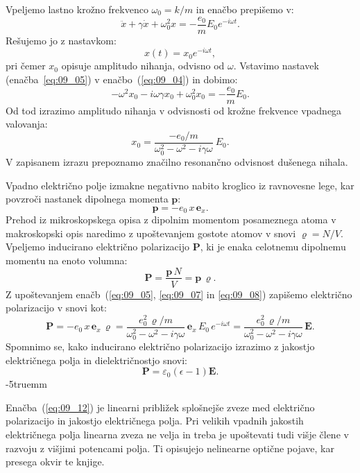 Vpeljemo lastno krožno frekvenco $\omega_0 = k/m$ in 
enačbo prepišemo v:
\begin{equation}
\ddot{x} + \gamma \dot{x} + \omega_0^2 x  = - \frac{e_0}{m} E_0 e^{-i \omega t}.
\label{eq:09_04}
\end{equation}
Rešujemo jo z nastavkom:
\begin{equation}
x(t) = x_0 e^{-i\omega t},
\label{eq:09_05}
\end{equation}
pri čemer $x_0$ opisuje amplitudo nihanja, odvisno od $\omega$. Vstavimo nastavek 
(enačba~\ref{eq:09_05}) v enačbo~(\ref{eq:09_04}) in dobimo:
\begin{equation}
-\omega^2 x_0 - i \omega \gamma x_0 + \omega_0^2 x_0  = - \frac{e_0}{m} E_0.
\label{eq:09_06}
\end{equation}
Od tod izrazimo amplitudo nihanja v odvisnosti od krožne frekvence vpadnega 
valovanja:
\begin{equation}
x_0 = \frac{-e_0/m}{\omega_0^2 - \omega^2 - i\gamma \omega}~E_0.
\label{eq:09_07}
\end{equation}
V zapisanem izrazu prepoznamo značilno resonančno odvisnost dušenega nihala. 

Vpadno električno polje izmakne negativno nabito kroglico iz ravnovesne 
lege, kar povzroči nastanek dipolnega momenta $\mathbf{p}$:
\begin{equation}
\mathbf{p} = -e_0\,x\,\mathbf{e}_x.
\label{eq:09_08}
\end{equation}
Prehod iz mikroskopskega opisa z dipolnim momentom posameznega atoma 
v makroskopski opis naredimo z upoštevanjem gostote atomov v snovi 
$\varrho = N/V$. Vpeljemo inducirano električno polarizacijo $\mathbf{P}$, ki 
je enaka celotnemu dipolnemu momentu na enoto volumna:
\begin{equation}
\mathbf{P} = \frac{\mathbf{p}\,N}{V} = \mathbf{p}\,\varrho. 
\label{eq:09_09}
\end{equation}
Z upoštevanjem enačb~(\ref{eq:09_05}, \ref{eq:09_07} in \ref{eq:09_08}) zapišemo 
električno polarizacijo v snovi kot:
\begin{equation}
\mathbf{P} = -e_0\,x\,\mathbf{e}_x\,\varrho = \frac{e_0^2\,\varrho/m}{\omega_0^2 
- \omega^2 - i\gamma \omega}\,\mathbf{e}_x\,E_0\,e^{-i\omega t} = 
\frac{e_0^2\,\varrho/m}{\omega_0^2 
- \omega^2 - i\gamma \omega}\,\mathbf{E}.
\label{eq:09_10}
\end{equation}
Spomnimo se, kako inducirano električno polarizacijo izrazimo z jakostjo
električnega polja in dielektričnostjo snovi:
\begin{equation}
\mathbf{P} = \varepsilon_0 (\epsilon-1) \mathbf{E}.
\label{eq:09_12}
\end{equation}
\vglue-5truemm
\begin{remark}
Enačba~(\ref{eq:09_12}) je linearni približek splošnejše zveze med električno polarizacijo in 
jakostjo električnega polja. Pri velikih vpadnih jakostih električnega polja linearna zveza 
ne velja in treba je upoštevati tudi višje člene v razvoju z višjimi potencami polja. Ti
opisujejo nelinearne optične pojave, kar presega okvir te knjige.
\end{remark}

